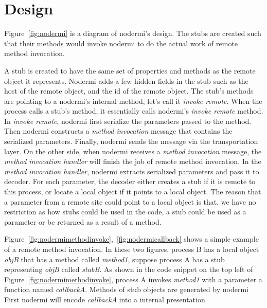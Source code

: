 \nodermifig{}

\section{Design}
Figure~\ref{fig:nodermi} is a diagram of nodermi's design.
The stubs are created such that their methods would invoke nodermi to do
the actual work of remote method invocation.

A stub is created to have the same set of properties and methods as the remote object
it represents.
Nodermi adds a few hidden fields in the stub such as the host of the remote object,
and the id of the remote object.
The stub's methods are pointing to a nodermi's internal method,
let's call it \emph{invoke remote}.
When the process calls a stub's method, 
it essentially calls nodermi's \emph{invoke remote} method. 
In \emph{invoke remote}, nodermi first serialize the parameters passed
to the method.
Then nodermi constructs a \emph{method invocation} message that contains
the serialized parameters.
Finally, nodermi sends the message via the transportation layer.
On the other side, when nodermi receives a \emph{method invocation} message,
the \emph{method invocation handler} will finish the job of remote method invocation.
In the \emph{method invocation handler},
nodermi extracts serialized parameters and pass it to decoder.
For each parameter,
the decoder either creates a stub if it is remote to this process,
or locate a local object if it points to a local object.
The reason that a parameter from a remote site could point to a local object is that,
we have no restriction as how stubs could be used in the code, 
a stub could be used as a parameter or be returned as a result of a method.

\nodrmimethodinvokefig{}
\nodrmicallbackfig{}

Figure~\ref{fig:nodermimethodinvoke},~\ref{fig:nodermicallback} shows a simple example
of a remote method invocation. 
In these two figures, process B has a local object \emph{objB} that has a method called \emph{method1},
suppose process A has a stub representing \emph{objB} called \emph{stubB}.
As shown in the code snippet on the top left of Figure~\ref{fig:nodermimethodinvoke},
process A invokes \emph{method1} with a parameter a function named \emph{callbackA}.
Methods of stub objects are generated by nodermi 
First nodermi will encode \emph{callbackA} into a internal presentation

